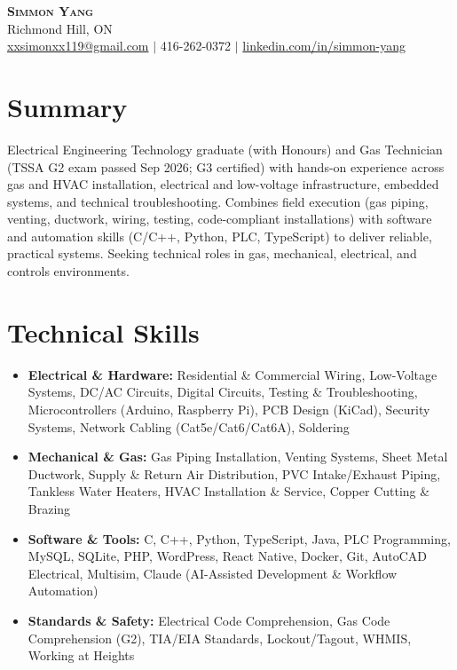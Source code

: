 \documentclass[letterpaper,11pt]{article}
\begin{document}
\begin{center}
    \textbf{\Huge \scshape Simmon Yang} \\ \vspace{1pt}
    Richmond Hill, ON \\
    \href{mailto:xxsimonxx119@gmail.com}{xxsimonxx119@gmail.com} $|$ 416-262-0372 $|$ 
    \href{https://www.linkedin.com/in/simmon-yang/}{linkedin.com/in/simmon-yang}
\end{center}

\section{Summary}
Electrical Engineering Technology graduate (with Honours) and Gas Technician (TSSA G2 exam passed Sep 2026; G3 certified) with hands-on experience across gas and HVAC installation, electrical and low-voltage infrastructure, embedded systems, and technical troubleshooting. Combines field execution (gas piping, venting, ductwork, wiring, testing, code-compliant installations) with software and automation skills (C/C++, Python, PLC, TypeScript) to deliver reliable, practical systems. Seeking technical roles in gas, mechanical, electrical, and controls environments.

\section{Technical Skills}
\begin{itemize}[leftmargin=0.15in]
  \item \textbf{Electrical \& Hardware:} Residential \& Commercial Wiring, Low-Voltage Systems, DC/AC Circuits, Digital Circuits, Testing \& Troubleshooting, Microcontrollers (Arduino, Raspberry Pi), PCB Design (KiCad), Security Systems, Network Cabling (Cat5e/Cat6/Cat6A), Soldering
  \item \textbf{Mechanical \& Gas:} Gas Piping Installation, Venting Systems, Sheet Metal Ductwork, Supply \& Return Air Distribution, PVC Intake/Exhaust Piping, Tankless Water Heaters, HVAC Installation \& Service, Copper Cutting \& Brazing
  \item \textbf{Software \& Tools:} C, C++, Python, TypeScript, Java, PLC Programming, MySQL, SQLite, PHP, WordPress, React Native, Docker, Git, AutoCAD Electrical, Multisim, Claude (AI-Assisted Development \& Workflow Automation)
  \item \textbf{Standards \& Safety:} Electrical Code Comprehension, Gas Code Comprehension (G2), TIA/EIA Standards, Lockout/Tagout, WHMIS, Working at Heights
\end{itemize}
\end{document}
